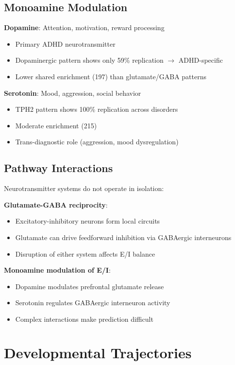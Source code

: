\documentclass[12pt,letterpaper]{article}
\begin{document}
\subsection{Monoamine Modulation}

\textbf{Dopamine}: Attention, motivation, reward processing
\begin{itemize}
    \item Primary ADHD neurotransmitter
    \item Dopaminergic pattern shows only 59\% replication $\rightarrow$ ADHD-specific
    \item Lower shared enrichment (197) than glutamate/GABA patterns
\end{itemize}

\textbf{Serotonin}: Mood, aggression, social behavior
\begin{itemize}
    \item TPH2 pattern shows 100\% replication across disorders
    \item Moderate enrichment (215)
    \item Trans-diagnostic role (aggression, mood dysregulation)
\end{itemize}

\subsection{Pathway Interactions}

Neurotransmitter systems do not operate in isolation:

\textbf{Glutamate-GABA reciprocity}:
\begin{itemize}
    \item Excitatory-inhibitory neurons form local circuits
    \item Glutamate can drive feedforward inhibition via GABAergic interneurons
    \item Disruption of either system affects E/I balance
\end{itemize}

\textbf{Monoamine modulation of E/I}:
\begin{itemize}
    \item Dopamine modulates prefrontal glutamate release
    \item Serotonin regulates GABAergic interneuron activity
    \item Complex interactions make prediction difficult
\end{itemize}

\section{Developmental Trajectories}
\end{document}
